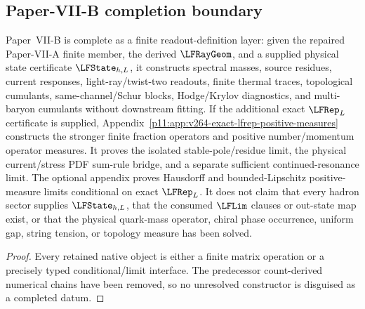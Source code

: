 \documentclass[12pt,a4paper]{article}
\begin{document}
\subsection{Paper-VII-B completion boundary}
\label{p11:sec:completion-certificate-derivation-protocol}

\begin{theorem}
\label{p11:thm:paper-xi-finite-qcd-completion-certificate}

Paper~VII-B is complete as a finite readout-definition layer: given the repaired
Paper-VII-A finite member, the derived \(\LFRayGeom\), and a supplied physical
state certificate \(\LFState_{h,L}\), it constructs spectral masses, source
residues, current responses, light-ray/twist-two readouts, finite thermal traces,
topological cumulants, same-channel/Schur blocks, Hodge/Krylov diagnostics, and
multi-baryon cumulants without downstream fitting.  If the additional exact
\(\LFRep_L\) certificate is supplied, Appendix~\ref{p11:app:v264-exact-lfrep-positive-measures}
constructs the stronger finite fraction operators and positive number/momentum
operator measures.  It proves the isolated stable-pole/residue limit, the physical current/stress
PDF sum-rule bridge, and a separate sufficient continued-resonance limit.  The
optional appendix proves Hausdorff and bounded-Lipschitz positive-measure limits
conditional on exact \(\LFRep_L\).  It does not claim that every hadron sector
supplies \(\LFState_{h,L}\), that the consumed \(\LFLim\) clauses or out-state map
exist, or that the physical quark-mass operator, chiral phase
occurrence, uniform gap, string tension, or topology measure has been solved.

\end{theorem}
\begin{proof}

Every retained native object is either a finite matrix operation or a precisely typed conditional/limit interface.  The predecessor count-derived numerical chains have been removed, so no unresolved constructor is disguised as a completed datum.
\end{proof}
\end{document}
